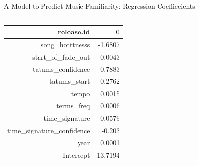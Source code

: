 \documentclass[aspectratio=169]{beamer}
\begin{document}
\begin{frame}{A Model to Predict Music Familiarity: Regression Coeffiecients}
\begin{columns}
\begin{column}{0.6\textwidth}
{\begin {table}[H]
\begin{tabular}{|r|r|}
release.id                &          0\\ \hline
song\_hotttnesss      &         -1.6807\\ \hline
start\_of\_fade\_out     &        -0.0043\\ \hline
tatums\_confidence      &        0.7883\\ \hline
tatums\_start              &    -0.2762\\ \hline
tempo                        &  0.0015\\ \hline
terms\_freq               &      0.0006\\ \hline
time\_signature           &     -0.0579\\ \hline
time\_signature\_confidence  &    -0.203\\ \hline
year                         &  0.0001\\ \hline
Intercept                   &  13.7194\\ \hline
\end{tabular}
\end{table}
}
\end{column}
\end{columns}
\end{frame}
\end{document}
